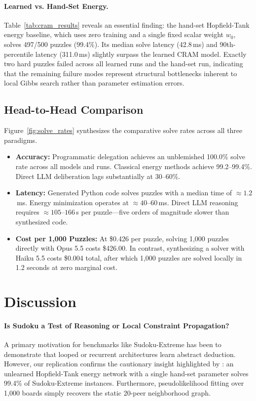 \documentclass{article} %
\begin{document}
\paragraph{Learned vs. Hand-Set Energy.} Table~\ref{tab:cram_results} reveals an essential finding: the hand-set Hopfield-Tank energy baseline, which uses zero training and a single fixed scalar weight $w_0$, solves 497/500 puzzles (99.4\%). Its median solve latency (42.8\,ms) and 90th-percentile latency (311.0\,ms) slightly surpass the learned CRAM model. Exactly two hard puzzles failed across all learned runs and the hand-set run, indicating that the remaining failure modes represent structural bottlenecks inherent to local Gibbs search rather than parameter estimation errors.

\subsection{Head-to-Head Comparison}
Figure~\ref{fig:solve_rates} synthesizes the comparative solve rates across all three paradigms. 

\begin{itemize}
    \item \textbf{Accuracy:} Programmatic delegation achieves an unblemished 100.0\% solve rate across all models and runs. Classical energy methods achieve 99.2--99.4\%. Direct LLM deliberation lags substantially at 30--60\%.
    \item \textbf{Latency:} Generated Python code solves puzzles with a median time of $\approx 1.2$\,ms. Energy minimization operates at $\approx 40$--$60$\,ms. Direct LLM reasoning requires $\approx 105$--$166$\,s per puzzle---five orders of magnitude slower than synthesized code.
    \item \textbf{Cost per 1,000 Puzzles:} At \$0.426 per puzzle, solving 1,000 puzzles directly with Opus 5.5 costs \$426.00. In contrast, synthesizing a solver with Haiku 5.5 costs \$0.004 total, after which 1,000 puzzles are solved locally in 1.2 seconds at zero marginal cost.
\end{itemize}

\section{Discussion}
\label{sec:discussion}

\paragraph{Is Sudoku a Test of Reasoning or Local Constraint Propagation?}
A primary motivation for benchmarks like Sudoku-Extreme has been to demonstrate that looped or recurrent architectures learn abstract deduction. However, our replication confirms the cautionary insight highlighted by \citet{hoover2026classical}: an unlearned Hopfield-Tank energy network with a single hand-set parameter solves 99.4\% of Sudoku-Extreme instances. Furthermore, pseudolikelihood fitting over 1,000 boards simply recovers the static 20-peer neighborhood graph. 
\end{document}
